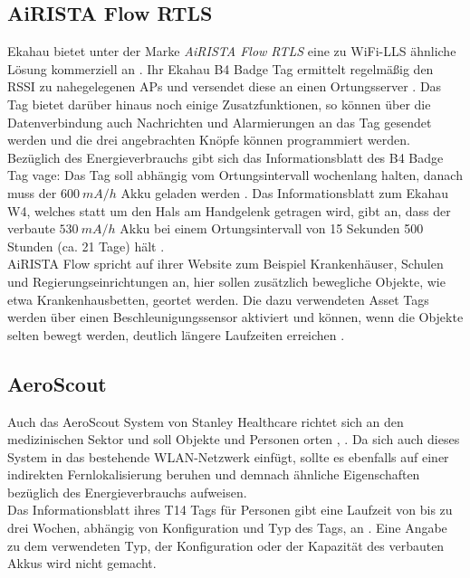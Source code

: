 \subsection{AiRISTA Flow RTLS}
Ekahau bietet unter der Marke \textit{AiRISTA Flow RTLS} eine zu WiFi-LLS ähnliche Lösung kommerziell an \cite{airista2017airista}.
Ihr Ekahau B4 Badge Tag ermittelt regelmäßig den RSSI zu nahegelegenen APs und versendet diese an einen Ortungsserver \cite{liu2007survey}.
Das Tag bietet darüber hinaus noch einige Zusatzfunktionen, so können über die Datenverbindung auch Nachrichten und Alarmierungen an das Tag gesendet werden und die drei angebrachten Knöpfe können programmiert werden.\\
Bezüglich des Energieverbrauchs gibt sich das Informationsblatt des B4 Badge Tag vage: Das Tag soll abhängig vom Ortungsintervall wochenlang halten, danach muss der $600\ mA/h$ Akku geladen werden \cite{ekahau2017b4}.
Das Informationsblatt zum Ekahau W4, welches statt um den Hals am Handgelenk getragen wird, gibt an, dass der verbaute $530\ mA/h$ Akku bei einem Ortungsintervall von 15 Sekunden 500 Stunden (ca. 21 Tage) hält \cite{ekahau2017w4}.\\
AiRISTA Flow spricht auf ihrer Website zum Beispiel Krankenhäuser, Schulen und Regierungseinrichtungen an, hier sollen zusätzlich bewegliche Objekte, wie etwa Krankenhausbetten, geortet werden.
Die dazu verwendeten Asset Tags werden über einen Beschleunigungssensor aktiviert und können, wenn die Objekte selten bewegt werden, deutlich längere Laufzeiten erreichen \cite{ekahau2017a4}. \\

\subsection{AeroScout}
Auch das AeroScout System von Stanley Healthcare richtet sich an den medizinischen Sektor und soll Objekte und Personen orten \cite{aeroscout2017asset}, \cite{aeroscout2017staff}.
Da sich auch dieses System in das bestehende WLAN-Netzwerk einfügt, sollte es ebenfalls auf einer indirekten Fernlokalisierung beruhen und demnach ähnliche Eigenschaften bezüglich des Energieverbrauchs aufweisen.\\
Das Informationsblatt ihres T14 Tags für Personen gibt eine Laufzeit von bis zu drei Wochen, abhängig von Konfiguration und Typ des Tags, an \cite{aeroscout2017t14}. 
Eine Angabe zu dem verwendeten Typ, der Konfiguration oder der Kapazität des verbauten Akkus wird nicht gemacht.\\

